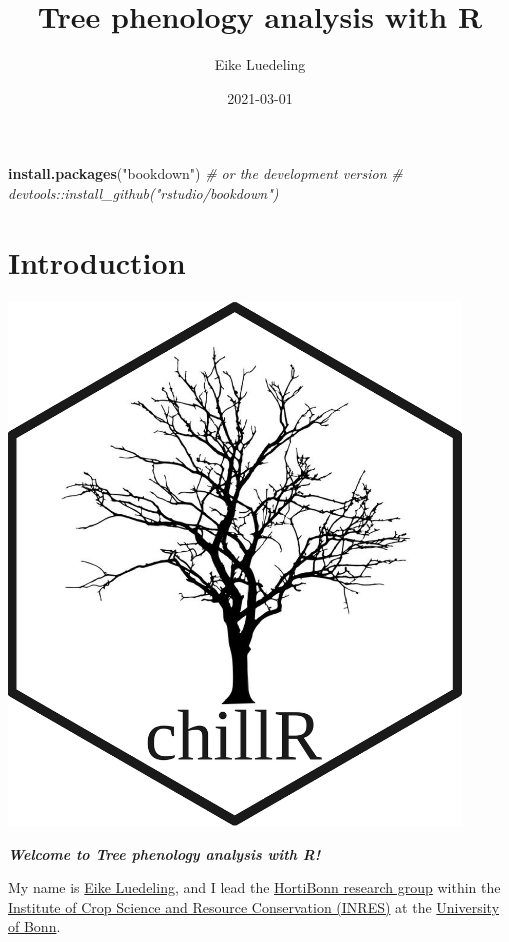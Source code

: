 \documentclass[
]{book}
\title{Tree phenology analysis with R}
\author{Eike Luedeling}
\date{2021-03-01}
\newenvironment{Shaded}{\begin{snugshade}}{\end{snugshade}}
\newcommand{\CommentTok}[1]{\textcolor[rgb]{0.56,0.35,0.01}{\textit{#1}}}
\newcommand{\KeywordTok}[1]{\textcolor[rgb]{0.13,0.29,0.53}{\textbf{#1}}}
\newcommand{\NormalTok}[1]{#1}
\newcommand{\StringTok}[1]{\textcolor[rgb]{0.31,0.60,0.02}{#1}}
\begin{document}
\maketitle

{
\setcounter{tocdepth}{1}
\tableofcontents
}
\begin{Shaded}
\begin{Highlighting}[]
\KeywordTok{install.packages}\NormalTok{(}\StringTok{"bookdown"}\NormalTok{)}
\CommentTok{# or the development version}
\CommentTok{# devtools::install_github("rstudio/bookdown")}
\end{Highlighting}
\end{Shaded}

\hypertarget{introduction}{%
\chapter{Introduction}\label{introduction}}

\includegraphics[width=0.9\textwidth,height=\textheight]{chillR_hexSticker.png}

\textbf{\emph{Welcome to Tree phenology analysis with R!}}

My name is \href{https://twitter.com/EikeLuedeling}{Eike Luedeling}, and I lead the \href{www.hortibonn.de}{HortiBonn research group} within the \href{https://www.inres.uni-bonn.de/}{Institute of Crop Science and Resource Conservation (INRES)} at the \href{https://www.uni-bonn.de/}{University of Bonn}.
\end{document}
